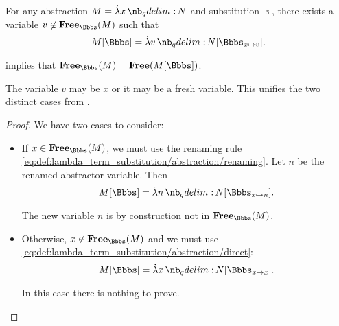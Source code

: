 \begin{proposition}\label{thm:lambda_substitution_single_rule}
  For any abstraction \( M = \qabs x N \) and substitution \( \Bbbs \), there exists a variable \( v \not\in \op*{Free}_\Bbbs(M) \) such that
  \begin{equation}\label{eq:thm:lambda_substitution_single_rule}
    M[\Bbbs] = \qabs v N[\Bbbs_{x \mapsto v}].
  \end{equation}
\end{proposition}
\begin{comments}
  \item {} implies that \( \op*{Free}_\Bbbs(M) = \op*{Free}(M[\Bbbs]) \).

  \item The variable \( v \) may be \( x \) or it may be a fresh variable. This unifies the two distinct cases from .
\end{comments}
\begin{proof}
  We have two cases to consider:
  \begin{itemize}
    \item If \( x \in \op*{Free}_\Bbbs(M) \), we must use the renaming rule \eqref{eq:def:lambda_term_substitution/abstraction/renaming}. Let \( n \) be the renamed abstractor variable. Then
    \begin{equation*}
      M[\Bbbs] = \qabs n N[\Bbbs_{x \mapsto n}].
    \end{equation*}

    The new variable \( n \) is by construction not in \( \op*{Free}_\Bbbs(M) \).

    \item Otherwise, \( x \not\in \op*{Free}_\Bbbs(M) \) and we must use \eqref{eq:def:lambda_term_substitution/abstraction/direct}:
    \begin{equation*}
      M[\Bbbs] = \qabs x N[\Bbbs_{x \mapsto x}].
    \end{equation*}

    In this case there is nothing to prove.
  \end{itemize}
\end{proof}

